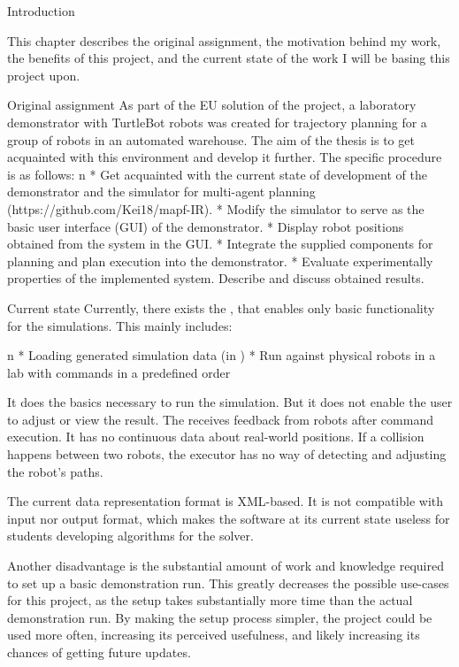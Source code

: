 \chap Introduction

This chapter describes the original assignment, the motivation behind my work, the benefits of this project, and the current state of the work I will be basing this project upon.

\sec Original assignment
As part of the EU solution of the {\safeLog} project, a laboratory demonstrator with TurtleBot robots was created for trajectory planning for a group of robots in an automated warehouse. The aim of the thesis is to get acquainted with this environment and develop it further. The specific procedure is as follows:
\begitems \style n
    * Get acquainted with the current state of development of the demonstrator and the simulator for multi-agent planning (https://github.com/Kei18/mapf-IR).
    * Modify the simulator to serve as the basic user interface (GUI) of the demonstrator.
    * Display robot positions obtained from the {\vicon} system in the GUI.
    * Integrate the supplied components for planning and plan execution into the demonstrator.
    * Evaluate experimentally properties of the implemented system. Describe and discuss obtained results.
\enditems

\sec Current state
Currently, there exists the {\oldRepo}, that enables only basic functionality for the simulations. This mainly includes:

\begitems \style n
    * Loading generated simulation data (in {\oldFormat})
    * Run against physical robots in a lab with commands in a predefined order
\enditems

It does the basics necessary to run the simulation. But it does not enable the user to adjust or view the result. The {\oldRepo} receives feedback from robots after command execution. It has no continuous data about real-world positions. If a collision happens between two robots, the executor has no way of detecting and adjusting the robot's paths.

The current data representation format is XML-based. It is not compatible with {\mapfIR} input nor output format, which makes the software at its current state useless for students developing algorithms for the {\mapfIR} solver. 

Another disadvantage is the substantial amount of work and knowledge required to set up a basic demonstration run. This greatly decreases the possible use-cases for this project, as the setup takes substantially more time than the actual demonstration run. By making the setup process simpler, the project could be used more often, increasing its perceived usefulness, and likely increasing its chances of getting future updates.

